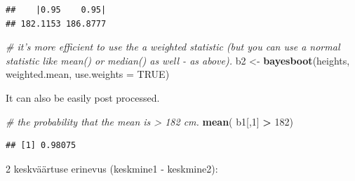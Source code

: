 \documentclass[]{book}
\newenvironment{Shaded}{\begin{snugshade}}{\end{snugshade}}
\newcommand{\KeywordTok}[1]{\textcolor[rgb]{0.13,0.29,0.53}{\textbf{#1}}}
\newcommand{\DataTypeTok}[1]{\textcolor[rgb]{0.13,0.29,0.53}{#1}}
\newcommand{\DecValTok}[1]{\textcolor[rgb]{0.00,0.00,0.81}{#1}}
\newcommand{\FloatTok}[1]{\textcolor[rgb]{0.00,0.00,0.81}{#1}}
\newcommand{\StringTok}[1]{\textcolor[rgb]{0.31,0.60,0.02}{#1}}
\newcommand{\CommentTok}[1]{\textcolor[rgb]{0.56,0.35,0.01}{\textit{#1}}}
\newcommand{\OtherTok}[1]{\textcolor[rgb]{0.56,0.35,0.01}{#1}}
\newcommand{\OperatorTok}[1]{\textcolor[rgb]{0.81,0.36,0.00}{\textbf{#1}}}
\newcommand{\NormalTok}[1]{#1}
\begin{document}
\begin{Shaded}
\end{Shaded}

\begin{verbatim}
##    |0.95    0.95| 
## 182.1153 186.8777
\end{verbatim}

\begin{Shaded}
\begin{Highlighting}[]
\CommentTok{# it's more efficient to use the a weighted statistic (but you can use a normal statistic like mean() or median() as well - as above).}
\NormalTok{b2 <-}\StringTok{ }\KeywordTok{bayesboot}\NormalTok{(heights, weighted.mean, }\DataTypeTok{use.weights =} \OtherTok{TRUE}\NormalTok{)}
\end{Highlighting}
\end{Shaded}

It can also be easily post processed.

\begin{Shaded}
\begin{Highlighting}[]
\CommentTok{# the probability that the mean is > 182 cm.}
\KeywordTok{mean}\NormalTok{( b1[,}\DecValTok{1}\NormalTok{] }\OperatorTok{>}\StringTok{ }\DecValTok{182}\NormalTok{)}
\end{Highlighting}
\end{Shaded}

\begin{verbatim}
## [1] 0.98075
\end{verbatim}

2 keskväärtuse erinevus (keskmine1 - keskmine2):

\begin{Shaded}
\end{Shaded}
\end{document}
